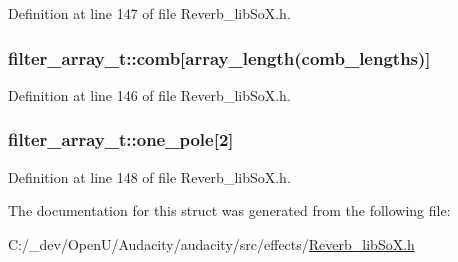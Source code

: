 Definition at line 147 of file Reverb\+\_\+lib\+So\+X.\+h.

\subsubsection[{\texorpdfstring{comb}{comb}}]{ filter\+\_\+array\+\_\+t\+::comb\mbox{[}{\bf array\+\_\+length}(comb\+\_\+lengths)\mbox{]}}\hypertarget{structfilter__array__t_a9efeba7af9f282455103e36dbd863cf2}{}\label{structfilter__array__t_a9efeba7af9f282455103e36dbd863cf2}


Definition at line 146 of file Reverb\+\_\+lib\+So\+X.\+h.

\subsubsection[{\texorpdfstring{one\+\_\+pole}{one_pole}}]{ filter\+\_\+array\+\_\+t\+::one\+\_\+pole\mbox{[}2\mbox{]}}\hypertarget{structfilter__array__t_ab87070871f23455e085f6dc6d1d1fa6c}{}\label{structfilter__array__t_ab87070871f23455e085f6dc6d1d1fa6c}


Definition at line 148 of file Reverb\+\_\+lib\+So\+X.\+h.



The documentation for this struct was generated from the following file\+:\begin{DoxyCompactItemize}
\item 
C\+:/\+\_\+dev/\+Open\+U/\+Audacity/audacity/src/effects/\hyperlink{_reverb__lib_so_x_8h}{Reverb\+\_\+lib\+So\+X.\+h}\end{DoxyCompactItemize}
